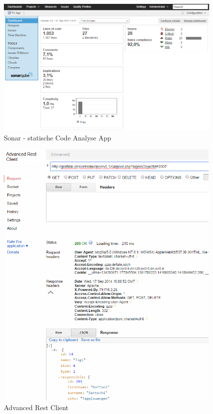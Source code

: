 \begin{figure}[h]
\centering
\includegraphics[scale=0.5]{images/sonar_app.png}
\caption{Sonar - statische Code Analyse App}
\label{fig:sonar_app}
\end{figure}

\begin{figure}[h]
\centering
\includegraphics[scale=0.5]{images/advanced_rest_client.png}
\caption{Advanced Rest Client}
\label{fig:advanced_rest_client}
\end{figure}

